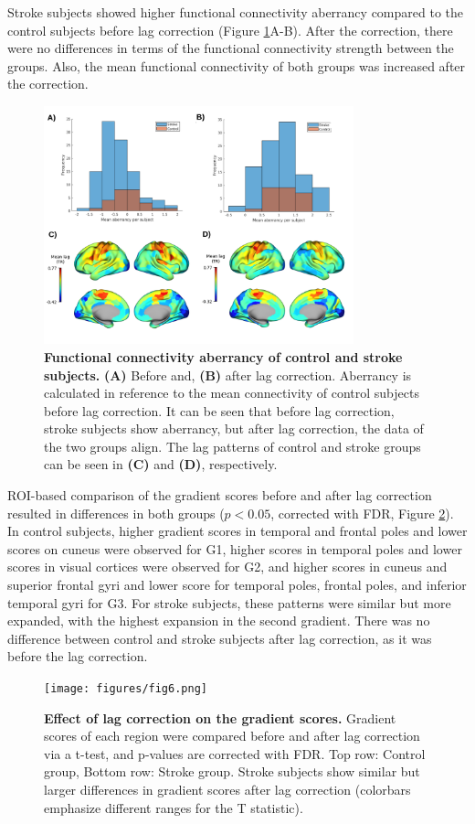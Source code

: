 \documentclass[fleqn,10pt]{wlscirep}
\begin{document}
Stroke subjects showed higher functional connectivity aberrancy compared to the control subjects before lag correction (Figure \ref{fig:lag_abr}A-B). After the correction, there were no differences in terms of the functional connectivity strength between the groups. Also, the mean functional connectivity of both groups was increased after the correction. 
\begin{figure}[tb]
\centering
\includegraphics[width=0.8\textwidth]{figures/afterlag.png}
\caption{\label{fig:lag_abr} \textbf{Functional connectivity aberrancy of control and stroke subjects.}  \textbf{(A)} Before  and, \textbf{(B)} after lag correction. Aberrancy is calculated in reference to the mean connectivity of control subjects before lag correction. It can be seen that before lag correction, stroke subjects show aberrancy, but after lag correction, the data of the two groups align. The lag patterns of control and stroke groups can be seen in \textbf{(C)} and \textbf{(D)}, respectively.} 
\end{figure}

ROI-based comparison of the gradient scores before and after lag correction resulted in differences in both groups ($p < 0.05$, corrected with FDR, Figure \ref{fig:afterlag}). In control subjects, higher gradient scores in temporal and frontal poles and lower scores on cuneus were observed for G1, higher scores in temporal poles and lower scores in visual cortices were observed for G2, and higher scores in cuneus and superior frontal gyri and lower score for temporal poles, frontal poles, and inferior temporal gyri for G3. For stroke subjects, these patterns were similar but more expanded, with the highest expansion in the second gradient. There was no difference between control and stroke subjects after lag correction, as it was before the lag correction. 
\begin{figure}[t]
\centering
\texttt{[image: figures/fig6.png]}
\caption{\label{fig:afterlag} \textbf{Effect of lag correction on the gradient scores.} Gradient scores of each region were compared before and after lag correction via a t-test, and p-values are corrected with FDR. Top row: Control group, Bottom row: Stroke group. Stroke subjects show similar but larger differences in gradient scores after lag correction (colorbars emphasize different ranges for the T statistic).} 
\end{figure}
\end{document}
